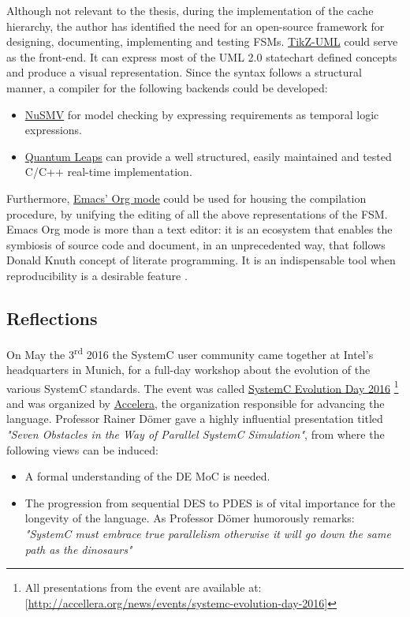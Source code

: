 \documentclass[11pt]{article}
\begin{document}
Although not relevant to the thesis, during the implementation of the cache hierarchy, the author has identified the need for an open-source framework for designing, documenting, implementing and testing FSMs.
\href{http://perso.ensta-paristech.fr/\~kielbasi/tikzuml/}{TikZ-UML} could serve as the front-end. 
It can express most of the UML 2.0 statechart defined concepts and produce a visual representation.
Since the syntax follows a structural manner, a compiler for the following backends could be developed:
\begin{itemize}
\item \href{http://nusmv.fbk.eu/}{NuSMV} for model checking by expressing requirements as temporal logic expressions.
\item \href{http://www.state-machine.com/}{Quantum Leaps} can provide a well structured, easily maintained and tested C/C++ real-time implementation.
\end{itemize}
Furthermore, \href{http://orgmode.org/}{Emacs' Org mode} could be used for housing the compilation procedure, by unifying the editing of all the above representations of the FSM.
Emacs Org mode is more than a text editor: it is an ecosystem that enables the symbiosis of source code and document, in an unprecedented way, that follows Donald Knuth concept of literate programming.
It is an indispensable tool when reproducibility is a desirable feature \cite{Schulte2011}.

\subsection{Reflections}
\label{sec:org4c22ca6}
On May the 3\textsuperscript{rd} 2016 the SystemC user community came together at Intel's headquarters in Munich, 
for a full-day workshop about the evolution of the various SystemC standards.
The event was called \href{http://accellera.org/news/events/systemc-evolution-day-2016}{SystemC Evolution Day 2016}  \footnote{All presentations from the event are available at: [\url{http://accellera.org/news/events/systemc-evolution-day-2016}]} and was organized by \href{http://accellera.org/about}{Accelera}, the organization responsible for advancing the language.
Professor Rainer Dömer gave a highly influential presentation titled \textit{"Seven Obstacles in the Way of Parallel SystemC Simulation"}, 
from where the following views can be induced:
\begin{itemize}
\item A formal understanding of the DE MoC is needed.
\item The progression from sequential DES to PDES is of vital importance for the longevity of the language. 
As Professor Dömer humorously remarks: \textit{"SystemC must embrace true parallelism otherwise it will go down the same path as the dinosaurs"}
\end{itemize}
\end{document}
